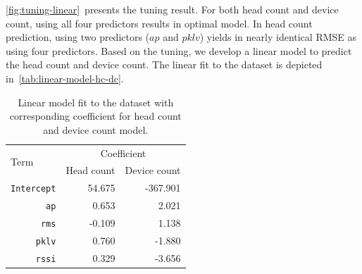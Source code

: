 	\autoref{fig:tuning-linear}~presents the tuning result. For both head count and device count, using all four predictors results in optimal model. In head count prediction, using two predictors ($ap$ and $pklv$) yields in nearly identical \ac{RMSE} as using four predictors. Based on the tuning, we develop a linear model to predict the head count and device count. The linear fit to the dataset is depicted in~\autoref{tab:linear-model-hc-dc}.

	
		\begin{table}[h]
		\centering
		\caption[Linear model fit to the dataset]
		{Linear model fit to the dataset with corresponding coefficient for head count and device count model.}
		\label{tab:linear-model-hc-dc}
		\begin{tabular}{rrr}
		\toprule
		\multicolumn{1}{l}{\multirow{2}{*}{Term}} & \multicolumn{2}{c}{Coefficient}                                   \\
		\multicolumn{1}{l}{}                      & \multicolumn{1}{c}{Head count} & \multicolumn{1}{c}{Device count} \\ \midrule
		\verb|Intercept|                          & 54.675 & -367.901 \\
		\verb|ap|                                 & 0.653  & 2.021 \\
		\verb|rms|                                & -0.109 & 1.138 \\
		\verb|pklv|                               & 0.760  & -1.880 \\
		\verb|rssi|                               & 0.329  & -3.656 \\ \bottomrule
		\end{tabular}
		\end{table}
	


	


